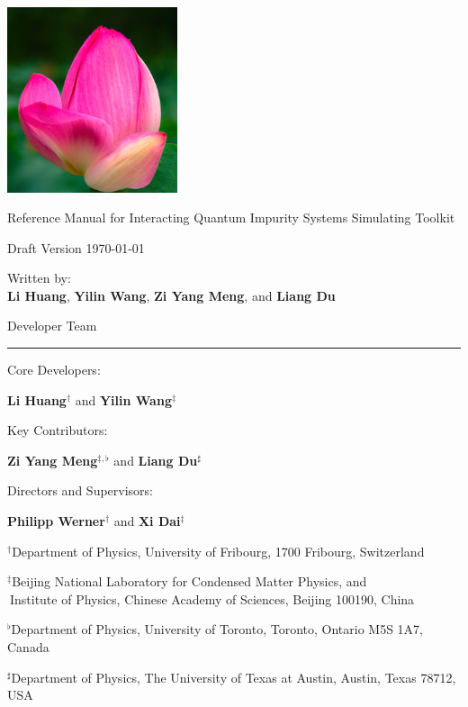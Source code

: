 {
\pagestyle{plain}
\parindent 0pt
\vbox{}

\includegraphics[width=5cm]{figure/cover.png}

\Huge{\textsf{Reference Manual for {\color{red}I}nteracting {\color{cyan}Q}uantum {\color{cyan}I}mpurity {\color{cyan}S}ystems Simulating {\color{cyan}T}oolkit}}

\Large{\textsf{Draft Version \today}}

\Large{\textsf{Written by}:\\ \textbf{Li Huang}, \textbf{Yilin Wang}, \textbf{Zi Yang Meng}, and \textbf{Liang Du}}

\vbox{}
\clearpage

\huge{{\iqist} Developer Team}

\vspace{-1cm}
\rule{\textwidth}{1pt}

\Large{Core Developers:}

\Large{\textbf{Li Huang}$^{\dagger}$ and \textbf{Yilin Wang}$^{\ddagger}$}

\Large{Key Contributors:}

\Large{\textbf{Zi Yang Meng}$^{\ddagger, \flat}$ and \textbf{Liang Du}$^{\sharp}$}

\Large{Directors and Supervisors:}

\Large{\textbf{Philipp Werner}$^{\dagger}$ and \textbf{Xi Dai}$^{\ddagger}$}

\vskip 1.0cm
$^{\dagger}$\large{\textsf{Department of Physics, University of Fribourg, 1700 Fribourg, Switzerland}}

$^{\ddagger}$\large{\textsf{Beijing National Laboratory for Condensed Matter Physics, and \\ 
$^{\ }$Institute of Physics, Chinese Academy of Sciences, Beijing 100190, China}}

$^{\flat}$\large{\textsf{Department of Physics, University of Toronto, Toronto, Ontario M5S 1A7, Canada}}

$^{\sharp}$\large{\textsf{Department of Physics, The University of Texas at Austin, Austin, Texas 78712, USA}}

\vbox{}         
\clearpage
}

